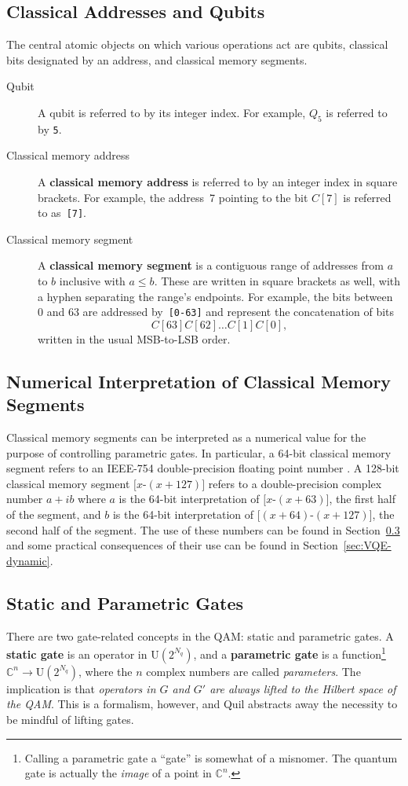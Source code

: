 \documentclass[conference]{IEEEtran}
\newcommand{\defn}[1]{\textbf{#1}}
\begin{document}
\subsection{Classical Addresses and Qubits}
The central atomic objects on which various operations act are qubits, classical bits designated by an address, and classical memory segments.
\begin{description}
\item[Qubit] A qubit is referred to by its integer index. For example, $Q_5$ is referred to by \verb|5|.
\item[Classical memory address] A \defn{classical memory address} is referred to by an integer index in square brackets. For example, the address~7 pointing to the bit $C[7]$ is referred to as~\verb|[7]|.
\item[Classical memory segment] A \defn{classical memory segment} is a contiguous range of addresses from $a$ to $b$ inclusive with $a\le b$. These are written in square brackets as well, with a hyphen separating the range's endpoints. For example, the bits between 0 and 63 are addressed by~\verb|[0-63]| and represent the concatenation of bits \[C[63] C[62] \ldots C[1] C[0],\] written in the usual MSB-to-LSB order.
\end{description}

\subsection{Numerical Interpretation of Classical Memory Segments}
Classical memory segments can be interpreted as a numerical value for the purpose of controlling parametric gates. In particular, a 64-bit classical memory segment refers to an IEEE-754 double-precision floating point number \cite{ieee754}. A 128-bit classical memory segment $\texttt{[}x\texttt{-}(x+127)\texttt{]}$ refers to a double-precision complex number $a+ib$ where $a$ is the 64-bit interpretation of $\texttt{[}x\texttt{-}(x+63)\texttt{]}$, the first half of the segment, and $b$ is the 64-bit interpretation of $\texttt{[}(x+64)\texttt{-}(x+127)\texttt{]}$, the second half of the segment. The use of these numbers can be found in Section~\ref{sec:gates} and some practical consequences of their use can be found in Section~\ref{sec:VQE-dynamic}.

\subsection{Static and Parametric Gates}\label{sec:gates}
There are two gate-related concepts in the QAM: static and parametric gates. A \defn{static gate} is an operator in $\mathrm{U}(2^{N_q})$, and a \defn{parametric gate} is a function\footnote{Calling a parametric gate a ``gate'' is somewhat of a misnomer. The quantum gate is actually the \emph{image} of a point in $\mathbb{C}^n$.} $\mathbb{C}^n\to\mathrm{U}(2^{N_q})$, where the $n$ complex numbers are called \emph{parameters}. The implication is that \emph{operators in $G$ and $G'$ are always lifted to the Hilbert space of the QAM}. This is a formalism, however, and Quil abstracts away the necessity to be mindful of lifting gates.
\end{document}

